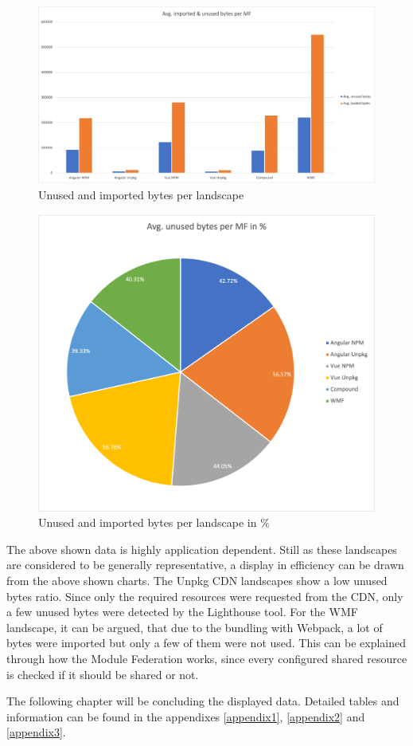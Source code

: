 \begin{figure}[!h]
	\centering
	\includegraphics[width=1\textwidth]{Figures/avg_unsed_imported_1.png}
	\caption{Unused and imported bytes per landscape}
	\label{fig:unsed_imported_1}
\end{figure}

\begin{figure}[!h]
	\centering
	\includegraphics[width=1\textwidth]{Figures/avg_unsed_imported_2.png}
	\caption{Unused and imported bytes per landscape in \%}
	\label{fig:unsed_imported_2}
\end{figure}

The above shown data is highly application dependent. Still as these landscapes are considered to be generally representative, a display in efficiency can be drawn from the above shown charts.
The Unpkg CDN landscapes show a low unused bytes ratio. Since only the required resources were requested from the CDN, only a few unused bytes were detected by the Lighthouse tool. 
For the WMF landscape, it can be argued, that due to the bundling with Webpack, a lot of bytes were imported but only a few of them were not used. This can be explained through how the Module Federation works, since every configured shared resource is checked if it should be shared or not.

The following chapter will be concluding the displayed data. Detailed tables and information can be found in the appendixes \ref{appendix1}, \ref{appendix2} and \ref{appendix3}.
